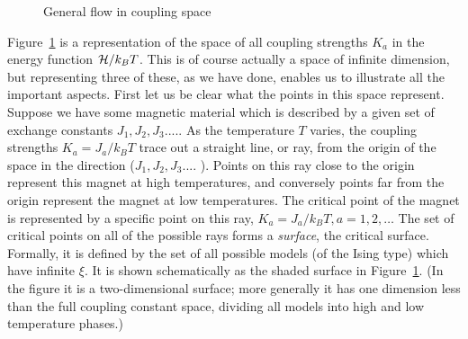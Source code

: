 \documentclass[
  letterpaper,
  enabledeprecatedfontcommands]{report}
\begin{document}
\begin{figure}


\caption{\label{fig-flow2}General flow in coupling space}

\end{figure}%

Figure~\ref{fig-flow2} is a representation of the space of all coupling
strengths \(K_a\) in the energy function \({\cal H}/k_BT\). This is of
course actually a space of infinite dimension, but representing three of
these, as we have done, enables us to illustrate all the important
aspects. First let us be clear what the points in this space represent.
Suppose we have some magnetic material which is described by a given set
of exchange constants \(J_1,J_2,J_3.....\) As the temperature \(T\)
varies, the coupling strengths \(K_a=J_a/k_BT\) trace out a straight
line, or ray, from the origin of the space in the direction
(\(J_1,J_2,J_3 ....\) ). Points on this ray close to the origin
represent this magnet at high temperatures, and conversely points far
from the origin represent the magnet at low temperatures. The critical
point of the magnet is represented by a specific point on this ray,
\(K_a=
J_a/k_BT, a= 1,2,\dots\) The set of critical points on all of the
possible rays forms a \emph{surface}, the critical surface. Formally, it
is defined by the set of all possible models (of the Ising type) which
have infinite \(\xi\). It is shown schematically as the shaded surface
in Figure~\ref{fig-flow2}. (In the figure it is a two-dimensional
surface; more generally it has one dimension less than the full coupling
constant space, dividing all models into high and low temperature
phases.)
\end{document}
